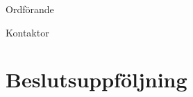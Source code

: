 \documentclass[10pt]{article}
\def\ordf{Fredrik Peterson}
\def\sekr{Erik Månsson}
\begin{document}
\begin{signatures}{2}
    \ist
    \signature{\ordf}{Ordförande}
    \signature{\sekr}{Kontaktor}
\end{signatures}

\section{Beslutsuppföljning}
\begin{busek}
\end{busek}

\begin{utskottsrapporter}
\end{utskottsrapporter}

\begin{valforslags}
\end{valforslags}

\begin{berattelser}
\end{berattelser}

\begin{stadgeandringar}
\end{stadgeandringar}

\begin{motioner}
\end{motioner}

\begin{propositioner}
    
    
    
    
\end{propositioner}
\end{document}
